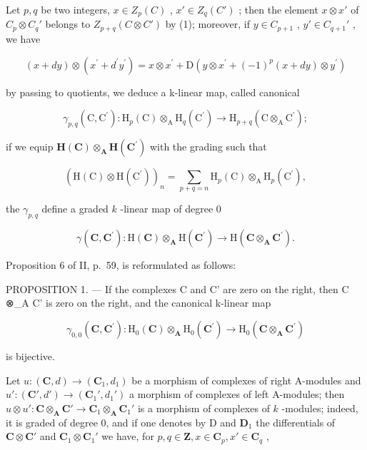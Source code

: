 Let \(p, q\) be two integers, \(x \in Z_p(C)\) , \(x' \in Z_q(C')\) ; then the element \(x \otimes x'\) of \(C_p \otimes C_q'\) belongs to \(Z_{p+q}(C \otimes C')\) by (1); moreover, if \(y \in C_{p+1}\) , \(y' \in C_{q+1}'\) , we have

\[
(x + d y) \otimes (x ^ {\prime} + d ^ {\prime} y ^ {\prime}) = x \otimes x ^ {\prime} + \mathrm{D} (y \otimes x ^ {\prime} + (- 1) ^ {p} (x + d y) \otimes y ^ {\prime})
\]

by passing to quotients, we deduce a k-linear map, called canonical

\[
\gamma_ {p, q} (\mathrm{C}, \mathrm{C} ^ {\prime}): \mathrm{H} _ {p} (\mathrm{C}) \otimes_ {\mathrm{A}} \mathrm{H} _ {q} (\mathrm{C} ^ {\prime}) \rightarrow \mathrm{H} _ {p + q} (\mathrm{C} \otimes_ {\mathrm{A}} \mathrm{C} ^ {\prime});
\]

if we equip \(\mathbf{H}(\mathbf{C})\otimes_{\mathbf{A}}\mathbf{H}(\mathbf{C}^{\prime})\) with the grading such that

\[
\left(\mathrm{H} (\mathrm{C}) \otimes \mathrm{H} (\mathrm{C} ^ {\prime})\right) _ {n} = \sum_ {p + q = n} \mathrm{H} _ {p} (\mathrm{C}) \otimes_ {\mathrm{A}} \mathrm{H} _ {p} (\mathrm{C} ^ {\prime}),
\]

the \(\gamma_{p,q}\) define a graded \(k\) -linear map of degree 0

\[
\gamma (\mathbf {C}, \mathbf {C} ^ {\prime}): \mathrm{H} (\mathbf {C}) \otimes_ {\mathbf {A}} \mathrm{H} (\mathbf {C} ^ {\prime}) \rightarrow \mathrm{H} (\mathbf {C} \otimes_ {\mathbf {A}} \mathbf {C} ^ {\prime}).
\]

Proposition 6 of II, p.~59, is reformulated as follows:

PROPOSITION 1. --- If the complexes C and C' are zero on the right, then C ⊗\_A C' is zero on the right, and the canonical k-linear map

\[
\gamma_ {0, 0} (\mathbf {C}, \mathbf {C} ^ {\prime}): \mathrm{H} _ {0} (\mathbf {C}) \otimes_ {\mathbf {A}} \mathrm{H} _ {0} (\mathbf {C} ^ {\prime}) \rightarrow \mathrm{H} _ {0} (\mathbf {C} \otimes_ {\mathbf {A}} \mathbf {C} ^ {\prime})
\]

is bijective.

Let \(u: (\mathbf{C}, d) \to (\mathbf{C}_1, d_1)\) be a morphism of complexes of right A-modules and \(u': (\mathbf{C}', d') \to (\mathbf{C}_1', d_1')\) a morphism of complexes of left A-modules; then \(u \otimes u': \mathbf{C} \otimes_{\mathbf{A}} \mathbf{C}' \to \mathbf{C}_1 \otimes_{\mathbf{A}} \mathbf{C}_1'\) is a morphism of complexes of \(k\) -modules; indeed, it is graded of degree 0, and if one denotes by D and \(\mathbf{D}_1\) the differentials of \(\mathbf{C} \otimes \mathbf{C}'\) and \(\mathbf{C}_1 \otimes \mathbf{C}_1'\) we have, for \(p, q \in \mathbf{Z}, x \in \mathbf{C}_p, x' \in \mathbf{C}_q\) ,

